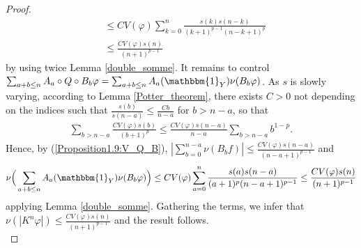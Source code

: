 \documentclass{ws-sd}
\newcommand{\indic}{\mathbbm{1}}
\newcommand{\abs}[1]{\left\lvert #1 \right\rvert}
\begin{document}
\begin{proof}
\begin{align*}
        &\le CV(\varphi)\sum_{k=0}^n \frac{s(k)s(n-k)}{(k+1)^{p-1}(n-k+1)^p} \\
        &\le \frac{CV(\varphi)s(n)}{(n+1)^{p-1}}
    \end{align*}
    by using twice Lemma \ref{double_somme}. It remains to control $\sum_{a+b \le n}A_a \circ Q \circ B_b\varphi = \sum_{a+b\le n}A_a(\indic_Y)\nu(B_b\varphi)$.
    As $s$ is slowly varying, according to Lemma \ref{Potter_theorem}, there exists $C >0$ not depending on the indices such that $\frac{s(b)}{s(n-a)} \le \frac{Cb}{n-a}$ for $b > n-a$, so that
    \begin{align*}
         \sum_{b > n-a} \frac{CV(\varphi)s(b)}{(b+1)^p}
         \le \frac{CV(\varphi)s(n-a)}{n-a}\sum_{b>n-a}b^{1-p}.
    \end{align*}
    Hence, by (\ref{Proposition1.9:V_Q_B}), $\abs{\sum_{b=0}^{n-a}\nu(B_bf)} \le \frac{CV(\varphi)s(n-a)}{(n-a+1)^{p-1}}$ and
    \begin{align*}
       \nu \Big(\sum_{a+b\le n}A_a(\indic_Y)\nu(B_b\varphi) \Big)
       \le CV(\varphi)\sum_{a=0}^n \frac{s(a)s(n-a)}{(a+1)^{p}(n-a+1)^{p-1}}
       \le \frac{CV(\varphi)s(n)}{(n+1)^{p-1}}
    \end{align*}
    applying Lemma \ref{double_somme}. Gathering the terms, we infer that $\nu(\abs{K^n\varphi}) \le \frac{CV(\varphi)s(n)}{(n+1)^{p-1}}$ and the result follows.
    \\
\end{proof}
\end{document}
